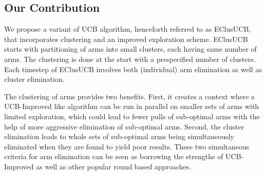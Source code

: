 \subsection{Our Contribution}
We propose a variant of UCB algorithm, henceforth referred to as EClusUCB, that incorporates clustering and an improved exploration scheme. EClusUCB starts with partitioning of arms into small clusters, each having same number of arms. The clustering is done at the start with a prespecified number of clusters. 
Each timestep of EClusUCB involves both (individual) arm elimination as well as cluster elimination. 


The clustering of arms provides two benefits. First, it creates a context where a UCB-Improved like algorithm can be run in parallel on smaller sets of arms with limited exploration, which could lead to fewer pulls of sub-optimal arms with the help of  more aggressive elimination of sub-optimal arms. Second, the cluster elimination leads to whole sets of sub-optimal arms being simultaneously eliminated when they are found to yield poor results. These two simultaneous criteria for arm elimination can be seen as borrowing the strengths of UCB-Improved as well as other popular round based approaches.


